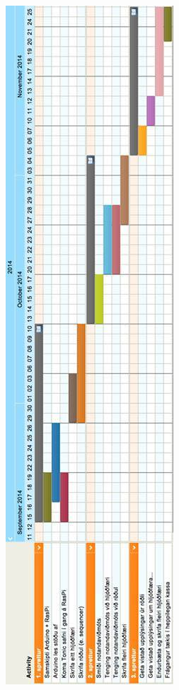 \documentclass[a4paper,11pt,twocolumn]{article}
\newenvironment{Figure}
  {\par\medskip\noindent\minipage{\linewidth}}
  {\endminipage\par\medskip}
\begin{document}
\newpage
\begin{Figure}
	\centering
 	\includegraphics[height=0.65\paperheight, width=0.4\linewidth]{timaaaetlun1.jpg}
\end{Figure}
\end{document}
